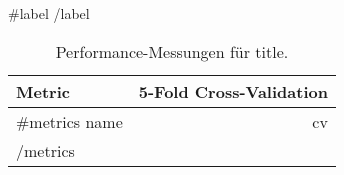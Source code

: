 \begin{table}[ht]
  \centering
  \caption{Performance-Messungen für {{title}}. }
  {{#label}}
  \label{tab:{{label}}-performance}
  {{/label}}
  \begin{tabular}{lr}
    \toprule
    Metric & 5-Fold Cross-Validation \\
    \midrule
    {{#metrics}}
      {{name}} & {{cv}}  \\
    {{/metrics}}
    \bottomrule
  \end{tabular}
\end{table}
